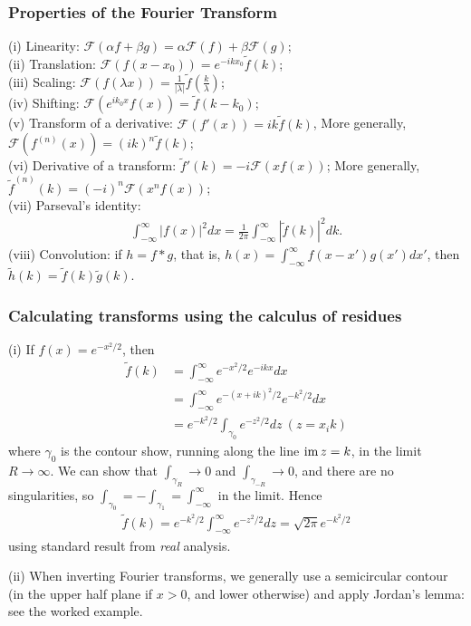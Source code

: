 \documentclass[a4paper]{article}
\begin{document}
\subsubsection{Properties of the Fourier Transform}
(i) Linearity: $\mathcal{F}(\alpha f + \beta g) = \alpha \mathcal{F}(f) + \beta \mathcal{F}(g)$;\\
(ii) Translation: $\mathcal{F}(f(x-x_0)) = e^{-ikx_0} \tilde{f}(k)$;\\
(iii) Scaling: $\mathcal{F}(f(\lambda x)) = \frac{1}{|\lambda|} \tilde{f}(\frac{k}{\lambda})$;\\
(iv) Shifting: $\mathcal{F} (e^{ik_0 x} f(x)) = \tilde{f}(k-k_0)$;\\
(v) Transform of a derivative: $\mathcal{F} (f'(x)) = ik \tilde{f}(k)$,
More generally, $\mathcal{F} (f^{(n)} (x)) = (ik)^n \tilde{f}(k)$;\\
(vi) Derivative of a transform: $\tilde{f}'(k) = -i\mathcal{F}(xf(x))$; More generally, $\tilde{f}^{(n)}(k) = (-i)^n \mathcal{F}(x^n f(x))$;\\
(vii) Parseval's identity:
\begin{equation*}
\begin{aligned}
\int_{-\infty}^\infty |f(x)|^2 dx = \frac{1}{2\pi} \int_{-\infty}^\infty |\tilde{f}(k)|^2 dk.
\end{aligned}
\end{equation*}
(viii) Convolution: if $h=f*g$, that is, $h(x) = \int_{-\infty}^\infty f(x-x') g(x') dx'$, then $\tilde{h}(k) = \tilde{f}(k) \tilde{g}(k)$.

\subsubsection{Calculating transforms using the calculus of residues}
\begin{eg}
(i) If $f(x) = e^{-x^2/2}$, then
\begin{equation*}
\begin{aligned}
\tilde{f}(k) &= \int_{-\infty}^\infty e^{-x^2/2} e^{-ikx} dx\\
&= \int_{-\infty}^\infty e^{-(x+ik)^2/2} e^{-k^2/2} dx\\
&= e^{-k^2/2} \int_{\gamma_0} e^{-z^2/2} dz \ (z=x_ik)
\end{aligned}
\end{equation*}
where $\gamma_0$ is the contour show, running along the line $\operatorname{im} z = k$, in the limit $R \to \infty$. We can show that $\int_{\gamma_R} \to 0$ and $\int_{\gamma_{-R}} \to 0$, and there are no singularities, so $\int_{\gamma_0} = -\int_{\gamma_1} = \int_{-\infty}^\infty$ in the limit. Hence
\begin{equation*}
\begin{aligned}
\tilde{f}(k) = e^{-k^2/2} \int_{-\infty}^\infty e^{-z^2/2} dz = \sqrt{2\pi} e^{-k^2/2}
\end{aligned}
\end{equation*}
using standard result from \emph{real} analysis.

(ii) When inverting Fourier transforms, we generally use a semicircular contour (in the upper half plane if $x>0$, and lower otherwise) and apply Jordan's lemma: see the worked example.
\end{eg}
\end{document}
